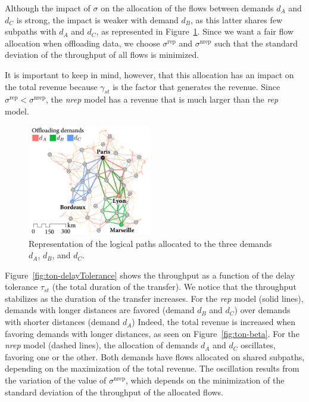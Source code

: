 Although the impact of $\sigma$ on the allocation of the flows between demands $d_A$ and $d_C$ is strong, the impact is weaker with demand $d_B$, as this latter shares few subpaths with $d_A$ and $d_C$, as represented in Figure~\ref{fig:allocation-subpaths-offloading-overlay}. Since we want a fair flow allocation when offloading data, we choose $\sigma^{\text{rep}}$ and $\sigma^{\text{nrep}}$ such that the standard deviation of the throughput of all flows is minimized.

It is important to keep in mind, however, that this allocation has an impact on the total revenue because $\gamma_{st}$ is the factor that generates the revenue. Since $\sigma^{\text{rep}} < \sigma^{\text{nrep}}$, the \textit{nrep} model has a revenue that is much larger than the \textit{rep} model. 

\begin{figure}
    \vspace{-15pt}
    \centering
    \includegraphics[width=5.4cm]{figures/France-AADT-overlay-layers.pdf}
    \caption{Representation of the logical paths allocated to the three demands $d_A$, $d_B$, and $d_C$.}
    \label{fig:allocation-subpaths-offloading-overlay}
\end{figure}
Figure~\ref{fig:ton-delayTolerance} shows the throughput as a function of the delay tolerance $\tau_{st}$ (\ie the total duration of the transfer). We notice that the throughput stabilizes as the duration of the transfer increases. For the \textit{rep} model (solid lines), demands with longer distances are favored (demand $d_B$ and $d_C$) over demands with shorter distances (demand $d_A$) Indeed, the total revenue is increased when favoring demands with longer distances, as seen on Figure~\ref{fig:ton-beta}. For the \textit{nrep} model (dashed lines), the allocation of demands $d_A$ and $d_C$ oscillates, favoring one or the other. Both demands have flows allocated on shared subpaths, depending on the maximization of the total revenue. The oscillation results from the variation of the value of $\sigma^{\text{nrep}}$, which depends on the minimization of the standard deviation of the throughput of the allocated flows.


